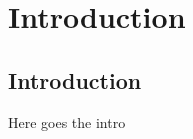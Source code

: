 


\part{Introduction}
\label{part:introduction}

\chapter{Introduction}
\label{ch:introduction}


Here goes the intro

\newpage

